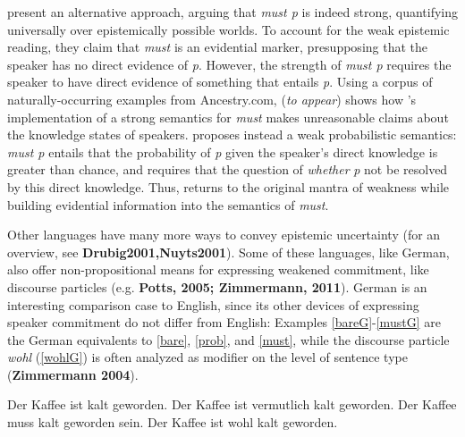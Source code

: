 \documentclass[11pt]{article}
\begin{document}
\cite{vonfintelgillies2010} present an alternative approach, arguing that \emph{must p} is indeed strong, quantifying universally over epistemically possible worlds. To account for the weak epistemic reading, they claim that \emph{must} is an evidential marker, presupposing that the speaker has no direct evidence of \emph{p}. However, the strength of \emph{must p} requires the speaker to have direct evidence of something that entails \emph{p}. Using a corpus of naturally-occurring examples from Ancestry.com, \citeauthor{lassiter2014salt} (\emph{to appear}) shows how \citeauthor{vonfintelgillies2010}'s implementation of a strong semantics for \emph{must} makes unreasonable claims about the knowledge states of speakers. \citeauthor{lassiter2014salt} proposes instead a weak probabilistic semantics: \emph{must p} entails that the probability of \emph{p} given the speaker's direct knowledge is greater than chance, and requires that the question of \emph{whether} \emph{p} not be resolved by this direct knowledge. Thus, \citeauthor{lassiter2014salt} returns to the original mantra of weakness while building evidential information into the semantics of \emph{must}.

Other languages have many more ways to convey epistemic uncertainty (for an overview, see \textbf{Drubig2001,Nuyts2001}). Some of these languages, like German, also offer non-propositional means for expressing weakened commitment, like discourse particles (e.g. \textbf{Potts, 2005; Zimmermann, 2011}). German is an interesting comparison case to English, since its other devices of expressing speaker commitment do not differ from English: Examples \ref{bareG}-\ref{mustG} are the German equivalents to \ref{bare}, \ref{prob}, and \ref{must}, while the discourse particle \emph{wohl} (\ref{wohlG}) is often analyzed as modifier on the level of sentence type (\textbf{Zimmermann 2004}).

\begin{exe}
	\ex\label{german} \begin{xlist}
		\ex\label{bareG} Der Kaffee ist kalt geworden.
		\ex\label{probG} Der Kaffee ist vermutlich kalt geworden.
		\ex\label{mustG} Der Kaffee muss kalt geworden sein. 
		\ex\label{wohlG} Der Kaffee ist wohl kalt geworden.
	\end{xlist}
\end{exe}
\end{document}
